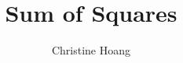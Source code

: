 \documentclass{article}
\title{Sum of Squares}
\author{Christine Hoang}
\begin{document}
\maketitle

\section{}
\end{document}
